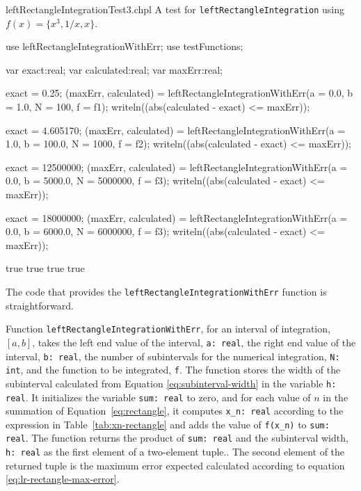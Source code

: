 \begin{chapelexample}{leftRectangleIntegrationTest3.chpl}
  A test for \lstinline{leftRectangleIntegration} using $f(x) = \{x^3, 1/x, x\}$.
  \begin{chapelpre}
  \end{chapelpre}
  \begin{chapel}
    use leftRectangleIntegrationWithErr;
    use testFunctions;

    var exact:real;
    var calculated:real;
    var maxErr:real;

    exact = 0.25;
    (maxErr, calculated) = leftRectangleIntegrationWithErr(a = 0.0, b = 1.0, N = 100, f = f1);
    writeln((abs(calculated - exact) <= maxErr));

    exact = 4.605170;
    (maxErr, calculated) = leftRectangleIntegrationWithErr(a = 1.0, b = 100.0, N = 1000, f = f2);
    writeln((abs(calculated - exact) <= maxErr));

    exact = 12500000;
    (maxErr, calculated) = leftRectangleIntegrationWithErr(a = 0.0, b = 5000.0, N = 5000000, f = f3);
    writeln((abs(calculated - exact) <= maxErr));

    exact = 18000000;
    (maxErr, calculated) = leftRectangleIntegrationWithErr(a = 0.0, b = 6000.0, N = 6000000, f = f3);
    writeln((abs(calculated - exact) <= maxErr));
  \end{chapel}
  \begin{chapelpost}
  \end{chapelpost}
  \begin{chapeloutput}
true
true
true
true
  \end{chapeloutput}
\end{chapelexample}

The code that provides the \lstinline{leftRectangleIntegrationWithErr} function is straightforward.
\begin{enumspec}
\item{} Function \lstinline{leftRectangleIntegrationWithErr}, for an interval
  of integration, $[a,b]$,
  takes the left end value of the interval, \lstinline{a: real}, the right end value
  of the interval, \lstinline{b: real}, the number of subintervals for the numerical
  integration, \lstinline{N: int}, and the function to be integrated, \lstinline{f}.
  The function stores the width of the subinterval calculated from Equation 
  \ref{eq:subinterval-width} in the variable \lstinline{h: real}. It initializes the variable
  \lstinline{sum: real} to zero, and for each value of $n$ in the summation of Equation~\ref{eq:rectangle},
  it computes \lstinline{x_n: real} according to the expression in Table~\ref{tab:xn-rectangle} and adds
  the value of \lstinline{f(x_n)} to \lstinline{sum: real}. The function returns the product of 
  \lstinline{sum: real} and the subinterval width, \lstinline{h: real} as the first element of a two-element
  tuple..
  The second element of the returned tuple is the
  maximum error expected calculated according to equation \ref{eq:lr-rectangle-max-error}.  
\end{enumspec}

